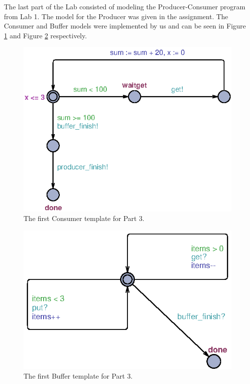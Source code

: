 \documentclass[a4paper,10pt]{article}
\begin{document}
The last part of the Lab consisted of modeling the Producer-Consumer program from Lab 1. The model for the Producer was given in the assignment. The Consumer and Buffer models were implemented by us and can be seen in Figure \ref{img:part3consumer} and Figure \ref{img:part3buffer} respectively.

\begin{figure}[h]
  \center
  \includegraphics{Part3Consumer.eps}
  \caption{The first Consumer template for Part 3.}
  \label{img:part3consumer}
\end{figure}

\begin{figure}[h]
  \center
  \includegraphics{Part3Buffer.eps}
  \caption{The first Buffer template for Part 3.}
  \label{img:part3buffer}
\end{figure}
\end{document}
